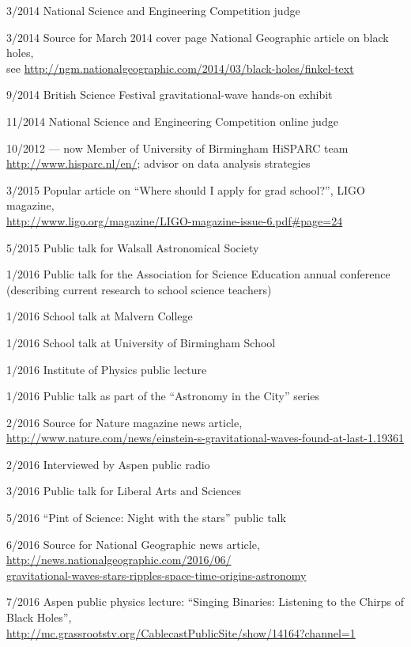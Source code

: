 \documentclass[margin,line]{res}
\begin{document}
\begin{resume}
3/2014	National Science and Engineering Competition judge

3/2014	Source for March 2014 cover page National Geographic article on black holes,\\ see \url{http://ngm.nationalgeographic.com/2014/03/black-holes/finkel-text}

9/2014	British Science Festival gravitational-wave hands-on exhibit

11/2014	National Science and Engineering Competition online judge

10/2012 --- now 	Member of University of Birmingham HiSPARC team \url{http://www.hisparc.nl/en/}; advisor on data analysis strategies

3/2015	Popular article on ``Where should I apply for grad school?'', LIGO magazine,\\ \url{http://www.ligo.org/magazine/LIGO-magazine-issue-6.pdf\#page=24}

5/2015 	Public talk for Walsall Astronomical Society

1/2016	Public talk for the Association for Science Education annual conference (describing current research to school science teachers)

1/2016 	School talk at Malvern College

1/2016 	School talk at University of Birmingham School

1/2016	Institute of Physics public lecture

1/2016	Public talk as part of the ``Astronomy in the City'' series

2/2016	Source for Nature magazine news article,\\ \url{http://www.nature.com/news/einstein-s-gravitational-waves-found-at-last-1.19361}

2/2016	Interviewed by Aspen public radio

3/2016	Public talk for Liberal Arts and Sciences 

5/2016	``Pint of Science: Night with the stars'' public talk

6/2016	Source for National Geographic news article,\\ \url{http://news.nationalgeographic.com/2016/06/}\\\url{gravitational-waves-stars-ripples-space-time-origins-astronomy}

7/2016	Aspen public physics lecture: ``Singing Binaries: Listening to the Chirps of Black Holes'',\\\url{http://mc.grassrootstv.org/CablecastPublicSite/show/14164?channel=1}


\end{resume}
\end{document}
